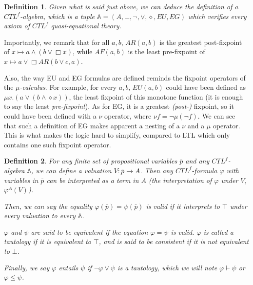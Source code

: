 \documentclass[11pt]{article}
\newcommand{\A}{{\mathbb A}}
\newtheorem{definition}{Definition}[section]
\begin{document}
\begin{definition}\label{CTLf-algebra}
    Given what is said just above, we can deduce the definition of a \emph{$CTL^f$-algebra}, which is a tuple $\A=(A,\bot,\neg,\vee,\diamond,EU,EG)$ which verifies every axiom of $CTL^f$ quasi-equational theory.
\end{definition}

Importantly, we remark that for all $a,b$, $AR(a,b)$ is the greatest post-fixpoint of $x \mapsto a \wedge (b \vee \Box x)$, while $AF(a,b)$ is the least pre-fixpoint of $x \mapsto a \vee \Box AR(b\vee c,a)$.

Also, the way EU and EG formulas are defined reminds the fixpoint operators of the \emph{$\mu$-calculus}. For example, for every $a,b$, $EU(a,b)$ could have been defined as $\mu x.(a \vee (b \wedge \diamond x))$, the least fixpoint of this monotone function (it is enough to say the least \emph{pre-fixpoint}). As for EG, it is a greatest \emph{(post-)} fixpoint, so it could have been defined with a $\nu$ operator, where $\nu f = \neg\mu(\neg f) $. We can see that such a definition of EG makes apparent a nesting of a $\nu$ and a $\mu$ operator. This is what makes the logic hard to simplify, compared to LTL which only contains one such fixpoint operator.  
\begin{definition}\label{interp_form_algebra}
    For any finite set of propositional variables $\bar{p}$ and any $CTL^f$-algebra $\A$, we can define a \emph{valuation} $V:\bar{p}\to A$. Then any $CTL^f$-formula $\varphi$ with variables in $\bar{p}$ can be interpreted as a term in $A$ (the \emph{interpretation} of $\varphi$ under $V$, $\varphi^A(V)$).

    Then, we can say the equality $\varphi(\bar{p})=\psi(\bar{p})$ is \emph{valid} if it interprets to $\top$ under every valuation to every $\A$.

    $\varphi$ and $\psi $ are said to be \emph{equivalent} if the equation $\varphi = \psi$ is valid. $\varphi$ is called a \emph{tautology} if it is equivalent to $\top$, and is said to be \emph{consistent} if it is not equivalent to $\bot$.

    Finally, we say $\varphi$ \emph{entails} $\psi$ if $\neg \varphi \vee \psi$ is a tautology, which we will note $\varphi \vdash \psi$ or $\varphi \leq \psi$.
\end{definition}
\end{document}

